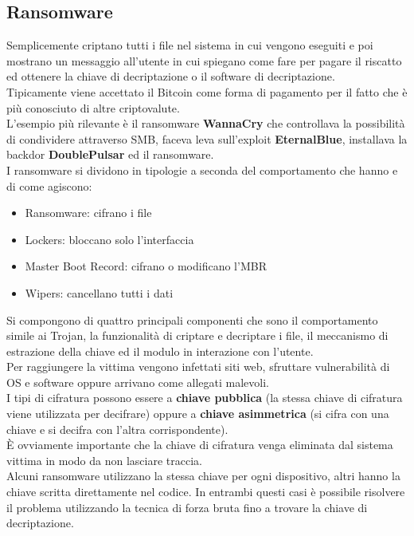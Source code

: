 \subsection{Ransomware}
Semplicemente criptano tutti i file nel sistema in cui vengono eseguiti e poi mostrano un messaggio all'utente in cui spiegano come fare per pagare il riscatto ed ottenere la chiave di decriptazione o il software di decriptazione.\\
Tipicamente viene accettato il Bitcoin come forma di pagamento per il fatto che è più conosciuto di altre criptovalute.\\
L'esempio più rilevante è il ransomware \textbf{WannaCry} che controllava la possibilità di condividere attraverso \acrshort{SMB}, faceva leva sull'exploit \textbf{EternalBlue}, installava la backdor \textbf{DoublePulsar} ed il ransomware.\\
I ransomware si dividono in tipologie a seconda del comportamento che hanno e di come agiscono:
\begin{itemize}[noitemsep]
    \item Ransomware: cifrano i file
    \item Lockers: bloccano solo l'interfaccia
    \item Master Boot Record: cifrano o modificano l'\acrshort{MBR}
    \item Wipers: cancellano tutti i dati
\end{itemize}
Si compongono di quattro principali componenti che sono il comportamento simile ai Trojan, la funzionalità di criptare e decriptare i file, il meccanismo di estrazione della chiave ed il modulo in interazione con l'utente.\\
Per raggiungere la vittima vengono infettati siti web, sfruttare vulnerabilità di \acrshort{OS} e software oppure arrivano come allegati malevoli.\\
I tipi di cifratura possono essere a \textbf{chiave pubblica} (la stessa chiave di cifratura viene utilizzata per decifrare) oppure a \textbf{chiave asimmetrica} (si cifra con una chiave e si decifra con l'altra corrispondente).\\
È ovviamente importante che la chiave di cifratura venga eliminata dal sistema vittima in modo da non lasciare traccia.\\
Alcuni ransomware utilizzano la stessa chiave per ogni dispositivo, altri hanno la chiave scritta direttamente nel codice.
In entrambi questi casi è possibile risolvere il problema utilizzando la tecnica di forza bruta fino a trovare la chiave di decriptazione.\\
